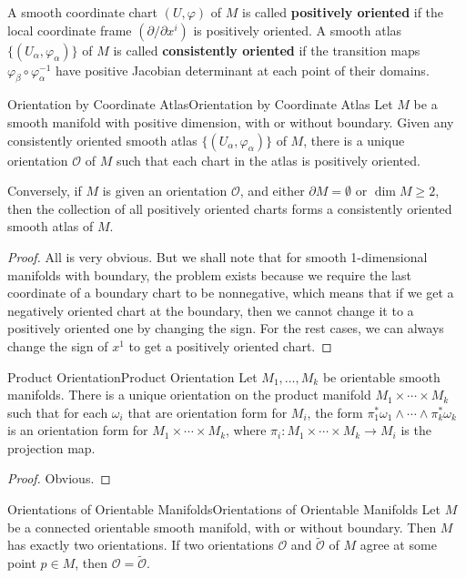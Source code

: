 \documentclass[../main.tex]{subfiles}
\begin{document}
A smooth coordinate chart $(U, \varphi)$ of $M$ is called \textbf{positively oriented} if the local coordinate frame $(\partial/\partial x^i)$ is positively oriented. A smooth atlas $\{(U_\alpha, \varphi_\alpha)\}$ of $M$ is called \textbf{consistently oriented} if the transition maps $\varphi_\beta \circ \varphi_\alpha^{-1}$ have positive Jacobian determinant at each point of their domains.

\begin{proposition}{Orientation by Coordinate Atlas}{Orientation by Coordinate Atlas}
  Let $M$ be a smooth manifold with positive dimension, with or without boundary. Given any consistently oriented smooth atlas $\{(U_\alpha, \varphi_\alpha)\}$ of $M$, there is a unique orientation $\mathcal{O}$ of $M$ such that each chart in the atlas is positively oriented.

  Conversely, if $M$ is given an orientation $\mathcal{O}$, and either $\partial M = \emptyset $ or $\dim M \geq 2$, then the collection of all positively oriented charts forms a consistently oriented smooth atlas of $M$.
\end{proposition}
\begin{proof}
  All is very obvious. But we shall note that for smooth 1-dimensional manifolds with boundary, the problem exists because we require the last coordinate of a boundary chart to be nonnegative, which means that if we get a negatively oriented chart at the boundary, then we cannot change it to a positively oriented one by changing the sign. For the rest cases, we can always change the sign of $x^1$ to get a positively oriented chart.
\end{proof}

\begin{proposition}{Product Orientation}{Product Orientation}
  Let $M_1, \ldots ,M_k$ be orientable smooth manifolds. There is a unique orientation on the product manifold $M_1 \times \cdots \times M_k$ such that for each $\omega_i$ that are orientation form for $M_i$, the form $\pi_1^* \omega_1 \wedge \cdots \wedge \pi_k^* \omega_k$ is an orientation form for $M_1 \times \cdots \times M_k$, where $\pi_i : M_1 \times \cdots \times M_k \to M_i$ is the projection map.
\end{proposition}
\begin{proof}
  Obvious.
\end{proof}

\begin{proposition}{Orientations of Orientable Manifolds}{Orientations of Orientable Manifolds}
  Let $M$ be a connected orientable smooth manifold, with or without boundary. Then $M$ has exactly two orientations. If two orientations $\mathcal{O}$ and $\tilde{\mathcal{O}}$ of $M$ agree at some point $p \in M$, then $\mathcal{O} = \tilde{\mathcal{O}}$.
\end{proposition}
\end{document}
